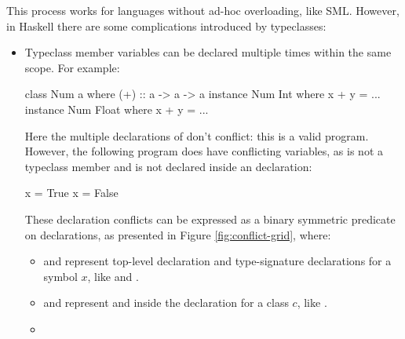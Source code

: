 \documentclass[dissertation.tex]{subfiles}
\begin{document}
{{        This process works for languages without ad-hoc overloading, like SML. However, in Haskell there are some
        complications introduced by typeclasses:

        \begin{itemize}
        \item
        {Typeclass member variables can be declared multiple times within the same scope. For example:
            
            \begin{haskellfigure}
            class Num a where
                (+) :: a -> a -> a
            instance Num Int where
                x + y = ...
            instance Num Float where
                x + y = ...
            \end{haskellfigure}

            Here the multiple declarations of \haskell{(+)} don't conflict: this is a valid program. However, the
            following program does have conflicting variables, as  is not a typeclass member and is not
            declared inside an  declaration:

            \begin{haskellfigure}
            x = True
            x = False
            \end{haskellfigure}

            These declaration conflicts can be expressed as a binary symmetric predicate on declarations, as presented
            in Figure \ref{fig:conflict-grid}, where:

            \begin{itemize}
            \item
            {

                 and  represent top-level declaration and type-signature
                declarations for a symbol \(x\), like  and .

            }
            \item
            {
                
                 and  represent  and  inside the declaration for a class \(c\), like .

            }
            \item
            {

}
\end{itemize}}
\end{itemize}}}
\end{document}
